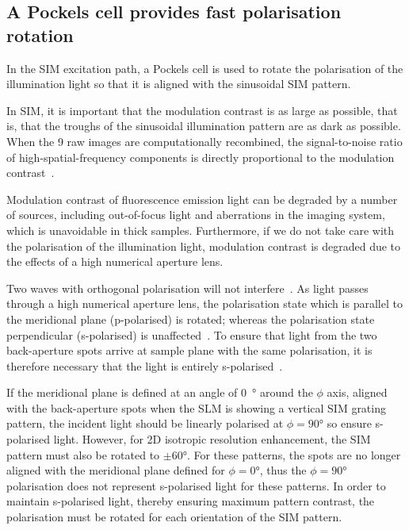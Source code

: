\subsection{A Pockels cell provides fast polarisation rotation} \label{sec:lagsim-pockels}
In the SIM excitation path, a Pockels cell is used to rotate the polarisation of the illumination light so that it is aligned with the sinusoidal SIM pattern. 

In SIM, it is important that the modulation contrast is as large as possible, that is, that the troughs of the sinusoidal illumination pattern are as dark as possible.
When the 9 raw images are computationally recombined, the signal-to-noise ratio of high-spatial-frequency components is directly proportional to the modulation contrast~\cite{oholleran2012polarization}.

Modulation contrast of fluorescence emission light can be degraded by a number of sources, including out-of-focus light and aberrations in the imaging system, which is unavoidable in thick samples. 
Furthermore, if we do not take care with the polarisation of the illumination light,  modulation contrast is degraded due to the effects of a high numerical aperture lens. 

Two waves with orthogonal polarisation will not interfere~\cite{nityananda2013interference}. 
As light passes through a high numerical aperture lens, the polarisation state which is parallel to the meridional plane (p-polarised) is rotated; whereas the polarisation state perpendicular (s-polarised) is unaffected~\cite{mansuripur1991effects}. 
To ensure that light from the two back-aperture spots arrive at sample plane with the same polarisation, it is therefore necessary that the light is entirely s-polarised~\cite{oholleran2012polarization}. 

If the meridional plane is defined at an angle of \SI{0}{\degree} around the $\phi$ axis, aligned with the back-aperture spots when the SLM is showing a vertical SIM grating pattern, the incident light should be linearly polarised at $\phi=90\si{\degree}$ so ensure s-polarised light. 
However, for 2D isotropic resolution enhancement, the SIM pattern must also be rotated to $\pm60\si{\degree}$. 
For these patterns, the spots are no longer aligned with the meridional plane defined for $\phi=0\si{\degree}$, thus the $\phi=90\si{\degree}$ polarisation does not represent s-polarised light for these patterns. 
In order to maintain s-polarised light, thereby ensuring maximum pattern contrast, the polarisation must be rotated for each orientation of the SIM pattern. 

